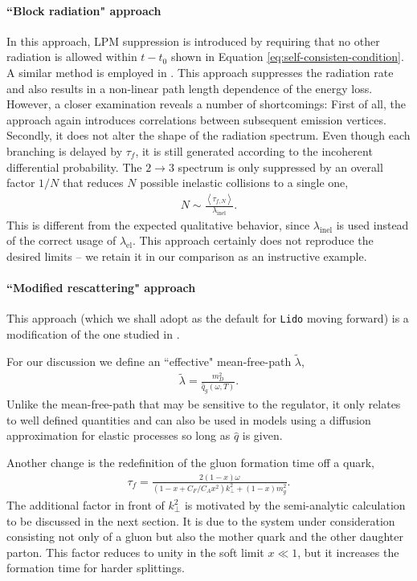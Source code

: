 \documentclass[aps, prc, reprint, amsmath, groupedaddress, nofootinbib]{revtex4-1}
\begin{document}
\paragraph*{``Block radiation" approach}
In this approach, LPM suppression is introduced by requiring that no other radiation is allowed within $t-t_0$ shown in Equation \ref{eq:self-consisten-condition}.
A similar method is employed in \cite{ColemanSmith:2012vr}.
This approach suppresses the radiation rate and also results in a non-linear path length dependence of the energy loss. However, a closer examination reveals a number of shortcomings: 
First of all, the approach again introduces correlations between subsequent emission vertices.
Secondly, it does not alter the shape of the radiation spectrum. Even though each branching is delayed by $\tau_f$, it is still generated according to the incoherent differential probability. 
The $2\rightarrow 3$ spectrum is only suppressed by an overall factor $1/N$ that reduces $N$ possible inelastic collisions to a single one,
\begin{eqnarray}
N \sim \frac{\left\langle\tau_{f,N}\right\rangle}{ \lambda_{\textrm{inel}}}.
\end{eqnarray}
This is different from the expected qualitative behavior, since $\lambda_{\textrm{inel}}$ is used instead of the correct usage of $\lambda_{\textrm{el}}$.
This approach certainly does not reproduce the desired limits -- we retain it in our comparison as an instructive example.

\paragraph*{``Modified rescattering" approach} This  approach (which we shall adopt as the default for {\tt Lido} moving forward) is a  modification of the one studied in \cite{Zapp:2011ya,Park:thesis,Park:2016jap}.


For our discussion we define an ``effective" mean-free-path $\tilde{\lambda}$,
\begin{eqnarray}\label{eq:effmpf}
\tilde{\lambda} = \frac{m_D^2}{\hat{q}_g(\omega, T)}.
\end{eqnarray}
Unlike the mean-free-path that may be sensitive to the regulator, it only relates to well defined quantities and can also be used in models using a diffusion approximation for elastic processes so long as $\hat{q}$ is given.


Another change is the redefinition of the gluon formation time off a quark,
\begin{eqnarray}\label{eq:formation-time-def}
\tau_f = \frac{2(1-x)\omega}{\left(1-x+C_F/C_A x^2\right)k_\perp^2 + (1-x)m_g^2}.
\end{eqnarray}
The additional factor in front of $k_\perp^2$ is motivated by the semi-analytic calculation to be discussed in the next section. It is due to the system under consideration consisting not only of a gluon but also the mother quark and the other daughter parton. 
This factor reduces to unity in the soft limit $x\ll 1$, but it increases the formation time for harder splittings. 
\end{document}
